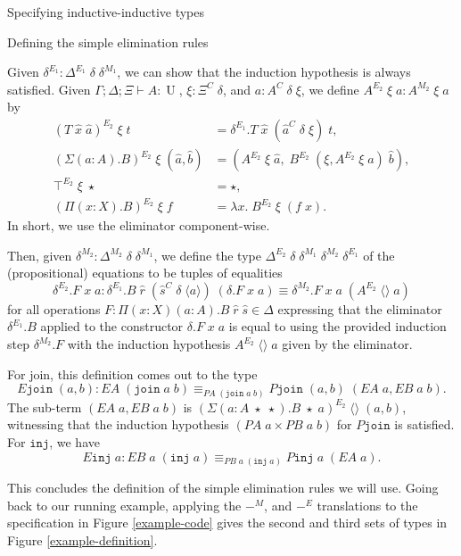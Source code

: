 \documentclass[acmsmall,review]{acmart}\settopmatter{printfolios=true,printccs=false,printacmref=false}
\DeclareMathOperator{\UU}{U}
\newcommand{\Id}[2]{{#1}\equiv{#2}}
\newcommand{\IdA}[3]{{#1}\equiv_{#3}{#2}}
\newcommand{\tac}{\vdash}
\newcommand{\join}{\texttt{join}}
\newcommand{\inj}{\texttt{inj}}
\def\emptytuple{\langle\rangle}
\begin{document}
\begin{section}{Specifying inductive-inductive types}
\begin{subsection}{\label{simple-elim-section}Defining the simple elimination rules}
\begin{definition}
Given $\delta^{E_1} : \Delta^{E_1}\;\delta\;\delta^{M_1}$, we can show that the induction hypothesis is always satisfied. Given $\Gamma ; \Delta ; \Xi \tac A : \UU$, $\xi : \Xi^C\;\delta$, and $a : A^C\;\delta\;\xi$, we define $A^{E_2}\;\xi\;a : A^{M_2}\;\xi\;a$ by
\begin{align*}
(T\;\hat{x}\;\hat{a})^{E_2}\;\xi\;t &= \delta^{E_1}.T\;\hat{x}\;(\hat{a}^C\;\delta\;\xi)\;t,\\
(\Sigma(a : A).B)^{E_2}\;\xi\;(\hat{a},\hat{b}) &= (A^{E_2}\;\xi\;\hat{a} ,\; B^{E_2}\;(\xi , A^{E_2}\;\xi\;a)\;\hat{b}),\\
\top^{E_2}\;\xi\;\star &= \star,\\
(\Pi(x : X).B)^{E_2}\;\xi\;f &= \lambda x.\; B^{E_2}\;\xi\;(f\;x).
\end{align*}
In short, we use the eliminator component-wise.

Then, given $\delta^{M_2} : \Delta^{M_2}\;\delta\;\delta^{M_1}$, we define the type $\Delta^{E_2}\;\delta\;\delta^{M_1}\;\delta^{M_2}\;\delta^{E_1}$ of the (propositional) equations to be tuples of equalities \[\delta^{E_2}.F\;x\;a : \Id{\delta^{E_1}.B\;\hat{r}\;(\hat{s}^C\;\delta\;\langle a \rangle)\;(\delta.F\;x\;a)}{\delta^{M_2}.F\;x\;a\;(A^{E_2}\;\emptytuple\;a)}\] for all operations $F : \Pi(x : X)(a : A).B\;\hat{r}\;\hat{s} \in\Delta$ expressing that the eliminator $\delta^{E_1}.B$ applied to the constructor $\delta.F\;x\;a$ is equal to using the provided induction step $\delta^{M_2}.F$ with the induction hypothesis $A^{E_2}\;\emptytuple\;a$ given by the eliminator.
\end{definition}

For join, this definition comes out to the type \[E\join\;(a, b) : \IdA{EA\;(\join\;a\;b)}{P\join\;(a,b)\;(EA\;a, EB\;a\;b)}{PA\;(\join\;a\;b)}.\] The sub-term $(EA\;a, EB\;a\;b)$ is $(\Sigma(a : A\;\star\;\star).B\;\star\;a)^{E_2}\;\emptytuple\;(a, b)$, witnessing that the induction hypothesis $(PA\;a \times PB\;a\;b)$ for $P\join$ is satisfied. For $\inj$, we have \[E\inj\;a : \IdA{EB\;a\;(\inj\;a)}{P\inj\;a\;(EA\;a)}{PB\;a\;(\inj\;a)}.\]

This concludes the definition of the simple elimination rules we will use. Going back to our running example, applying the $-^M$, and $-^E$ translations to the specification in Figure \ref{example-code} gives the second and third sets of types in Figure \ref{example-definition}.


\end{subsection}
\end{section}
\end{document}
